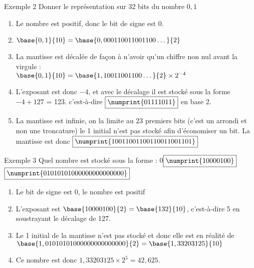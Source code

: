 \documentclass[10pt]{beamer}
\begin{document}
\begin{frame}{\Ctitle}{\stitle}
    \begin{exampleblock}{Exemple 2}
        Donner le représentation sur 32 bits du nombre $0,1$
        \begin{enumerate}
            \item<2-> Le nombre est positif, donc le bit de signe est \textcolor{BrickRed}{$\boxed{0}$}.
            \item<3-> $\base{0,1}{10} = \base{0,000110011001100\dots}{2}$
            \item<4-> La mantisse est décalée de façon à n'avoir qu'un chiffre non nul avant la virgule : \\
            $\base{0,1}{10} = \base{1,10011001100\dots}{2} \times 2^{-4}$
            \item<5-> L'exposant est donc $-4$, et avec le décalage il est stocké sous la forme $-4+127$ = 123. c'est-à-dire \textcolor{blue}{$\boxed{\numprint{01111011}}$} en base 2. 
            \item<6-> La mantisse est infinie, on la limite au 23 premiers bits (c'est un arrondi et non une troncature) le 1 initial  n'est pas stocké afin d'économiser un bit. La mantisse est donc \textcolor{OliveGreen}{$\boxed{\numprint{10011001100110011001101}}$}
        \end{enumerate}
    \end{exampleblock}
\end{frame}

\begin{frame}{\Ctitle}{\stitle}
    \begin{exampleblock}{Exemple 3}
        Quel nombre est stocké sous la forme : 
        \textcolor{BrickRed}{$\boxed{0}$}\textcolor{blue}{$\boxed{\numprint{10000100}}$}\textcolor{OliveGreen}{$\boxed{\numprint{01010101000000000000000}}$}
        \begin{enumerate}
            \item<1-> Le bit de signe est 0, le nombre est positif
            \item<2-> L'exposant est $\base{10000100}{2} = \base{132}{10}$, c'est-à-dire 5 en soustrayant le décalage de 127.
            \item<3-> Le 1 initial de la mantisse n'est pas stocké et donc elle est en réalité de $\base{1,01010101000000000000000}{2}=\base{1,33203125}{10}$
            \item<4-> Ce nombre est donc $1,33203125 \times 2^5 = 42,625$.
        \end{enumerate}
    \end{exampleblock}
\end{frame}
\end{document}
